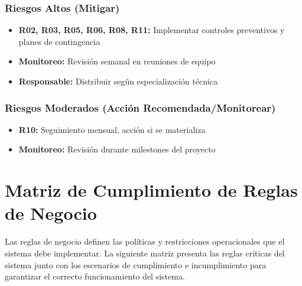 \subsubsection{Riesgos Altos (Mitigar)}
\begin{itemize}
    \item \textbf{R02, R03, R05, R06, R08, R11:} Implementar controles preventivos y planes de contingencia
    \item \textbf{Monitoreo:} Revisión semanal en reuniones de equipo
    \item \textbf{Responsable:} Distribuir según especialización técnica
\end{itemize}

\subsubsection{Riesgos Moderados (Acción Recomendada/Monitorear)}
\begin{itemize}
    \item \textbf{R10:} Seguimiento mensual, acción si se materializa
    \item \textbf{Monitoreo:} Revisión durante milestones del proyecto
\end{itemize}

\section{Matriz de Cumplimiento de Reglas de Negocio}

Las reglas de negocio definen las políticas y restricciones operacionales que el sistema debe implementar. La siguiente matriz presenta las reglas críticas del sistema junto con los escenarios de cumplimiento e incumplimiento para garantizar el correcto funcionamiento del sistema.


